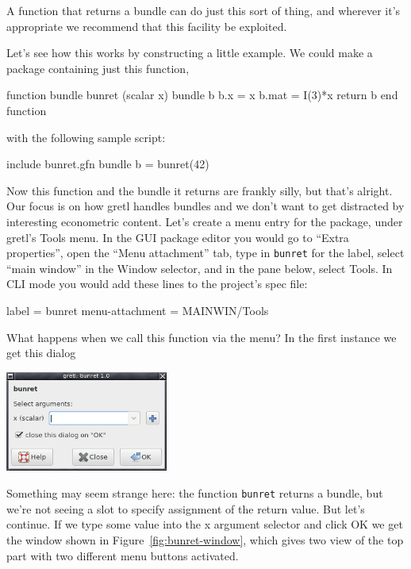 \documentclass[oneside]{book}
\begin{document}
A function that returns a bundle can do just this sort of thing, and
wherever it's appropriate we recommend that this facility be
exploited.

Let's see how this works by constructing a little example. We could
make a package containing just this function,
%
\begin{code}
function bundle bunret (scalar x)
  bundle b
  b.x = x
  b.mat = I(3)*x
  return b
end function
\end{code}
%
with the following sample script:
%
\begin{code}
include bunret.gfn
bundle b = bunret(42)
\end{code}

Now this function and the bundle it returns are frankly silly, but
that's alright. Our focus is on how gretl handles bundles and we don't
want to get distracted by interesting econometric content. Let's
create a menu entry for the package, under gretl's \textsf{Tools}
menu. In the GUI package editor you would go to ``Extra properties'',
open the ``Menu attachment'' tab, type in \texttt{bunret} for the
label, select ``main window'' in the Window selector, and in the pane
below, select Tools. In CLI mode you would add these lines to the
project's \textsf{spec} file:
%
\begin{code}
label = bunret
menu-attachment = MAINWIN/Tools
\end{code}

What happens when we call this function via the menu? In the first
instance we get this dialog

\begin{center}
  \includegraphics[width=0.4\textwidth]{figures/bunret-call}
\end{center}

Something may seem strange here: the function \texttt{bunret} returns
a bundle, but we're not seeing a slot to specify assignment of the
return value. But let's continue. If we type some value into the
\textsf{x} argument selector and click \textsf{OK} we get the window
shown in Figure~\ref{fig:bunret-window}, which gives two view of the
top part with two different menu buttons activated.
\end{document}
